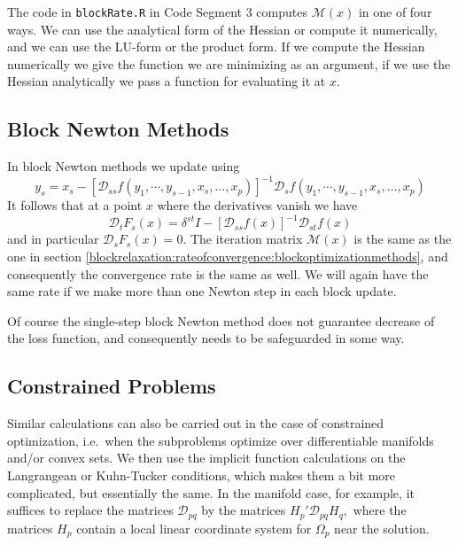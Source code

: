 \documentclass[
  12pt,
]{book}
\begin{document}
The code in \texttt{blockRate.R} in Code Segment 3 computes \(\mathcal{M}(x)\) in one of four ways. We can use the analytical form of the Hessian or compute it numerically, and we can use the LU-form or the product form. If we compute the Hessian numerically we give the function we are minimizing as an argument, if we use the Hessian analytically we pass a function for evaluating it
at \(x\).

\hypertarget{blockrelaxation:rateofconvergence:blocknewtonmethods}{%
\subsection{Block Newton Methods}\label{blockrelaxation:rateofconvergence:blocknewtonmethods}}

In block Newton methods we update using
\[
y_s=x_s-[\mathcal{D}_{ss}f(y_1,\cdots,y_{s-1},x_s,\dots,x_p)]^{-1}\mathcal{D}_{s}f(y_1,\cdots,y_{s-1},x_s,\dots,x_p)
\]
It follows that at a point \(x\) where the derivatives vanish we have
\[
\mathcal{D}_tF_s(x)=\delta^{st}I-[\mathcal{D}_{ss}f(x)]^{-1}\mathcal{D}_{st}f(x)
\]
and in particular \(\mathcal{D}_sF_s(x)=0\). The iteration matrix \(\mathcal{M}(x)\) is the same as
the one in section \ref{blockrelaxation:rateofconvergence:blockoptimizationmethods}, and consequently the convergence rate
is the same as well. We will again have the same rate if we make more than one Newton step in each block
update.

Of course the single-step block Newton method does not guarantee decrease of the loss function, and consequently needs to be safeguarded in some way.

\hypertarget{blockrelaxation:rateofconvergence:constrainedproblems}{%
\subsection{Constrained Problems}\label{blockrelaxation:rateofconvergence:constrainedproblems}}

Similar calculations can also be carried out in the case
of constrained optimization, i.e.~when the subproblems optimize
over differentiable manifolds and/or convex sets. We then use the implicit
function calculations on the Langrangean or Kuhn-Tucker conditions, which
makes them a bit more complicated, but essentially the same. In the
manifold case, for example, it suffices to replace the matrices \(\mathcal{D}_{pq}\) by the
matrices \(H_p'\mathcal{D}_{pq}H_{q},\) where the matrices \(H_p\) contain a local linear coordinate system for \(\Omega_p\) near
the solution.
\end{document}
